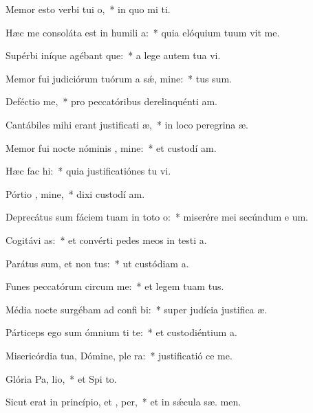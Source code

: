 \item Memor esto verbi tui  o,~* in quo mi  ti.
\item Hæc me consoláta est in humili a:~* quia elóquium tuum vit me.
\item Supérbi iníque agébant que:~* a lege autem tua  vi.
\item Memor fui judiciórum tuórum a sǽ, mine:~*  tus sum.
\item Deféctio  me,~* pro peccatóribus derelinquénti  am.
\item Cantábiles mihi erant justificati æ,~* in loco peregrina æ.
\item Memor fui nocte nóminis , mine:~* et custodí  am.
\item Hæc fac  hi:~* quia justificatiónes tu vi.
\item Pórtio , mine,~* dixi custodí  am.
\item Deprecátus sum fáciem tuam in toto  o:~* miserére mei secúndum e um.
\item Cogitávi  as:~* et convérti pedes meos in testi a.
\item Parátus sum, et non  tus:~* ut custódiam  a.
\item Funes peccatórum circum  me:~* et legem tuam   tus.
\item Média nocte surgébam ad confi bi:~* super judícia justifica æ.
\item Párticeps ego sum ómnium ti te:~* et custodiéntium  a.
\item Misericórdia tua, Dómine, ple  ra:~* justificatió  ce me.
\item Glória Pa,  lio,~* et Spi to.
\item Sicut erat in princípio, et ,  per,~* et in sǽcula sæ. men.
